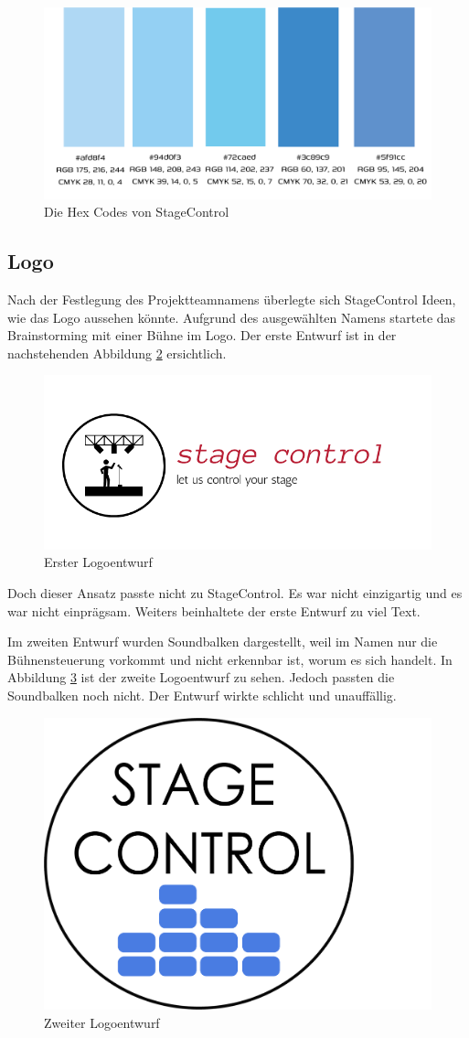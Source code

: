 \begin{figure}[H]
	\centering
	\includegraphics[width=0.7\linewidth]{images/Hexcode.png}
	\caption[Die Hex Codes von StageControl]{Die Hex Codes von StageControl}
	\label{fig:Hexcode}
\end{figure}


\subsection{Logo}
Nach der Festlegung des Projektteamnamens überlegte sich StageControl Ideen, wie das Logo aussehen könnte. Aufgrund des ausgewählten Namens startete das Brainstorming mit einer Bühne im Logo. Der erste Entwurf ist in der nachstehenden Abbildung \ref{fig:Logoentwurf1} ersichtlich. 

\begin{figure}[H]
	\centering
	\includegraphics[width=0.5\linewidth]{images/Logoentwurf1.png}
	\caption[Erster Logoentwurf]{Erster Logoentwurf}
	\label{fig:Logoentwurf1}
\end{figure}

Doch dieser Ansatz passte nicht zu StageControl. Es war nicht einzigartig und es war nicht einprägsam. Weiters beinhaltete der erste Entwurf zu viel Text. 

\newpage
Im zweiten Entwurf wurden Soundbalken dargestellt, weil im Namen nur die Bühnensteuerung vorkommt und nicht erkennbar ist, worum es sich handelt. In Abbildung \ref{fig:Logoentwurf2} ist der zweite Logoentwurf zu sehen. Jedoch passten die Soundbalken noch nicht. Der Entwurf wirkte schlicht und unauffällig. 

\begin{figure}[H]
	\centering
	\includegraphics[width=0.5\linewidth]{images/Logoentwurf2.png}
	\caption[Zweiter Logoentwurf]{Zweiter Logoentwurf}
	\label{fig:Logoentwurf2}
\end{figure}


